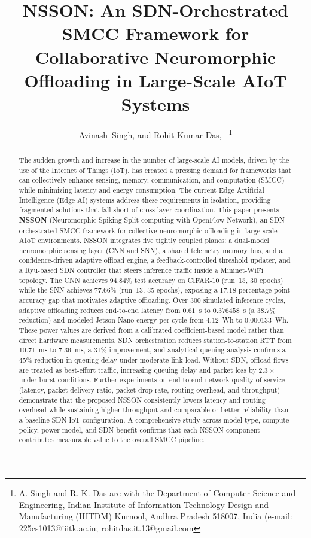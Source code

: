 \documentclass[journal]{IEEEtran}
\title{NSSON: An SDN-Orchestrated SMCC Framework for Collaborative Neuromorphic Offloading in Large-Scale AIoT Systems}
\author{Avinash~Singh, and Rohit Kumar Das,~\IEEEmembership{Senior Member,~IEEE,}
\thanks{A. Singh and R. K. Das are with the Department of Computer Science and Engineering, Indian Institute of Information Technology Design and Manufacturing (IIITDM) Kurnool, Andhra Pradesh 518007, India (e-mail: 225cs1013@iiitk.ac.in; rohitdas.it.13@gmail.com}%
}
\newcommand{\revblue}[1]{\textcolor{revblue}{#1}}
\begin{document}
\maketitle

\begin{abstract}
The sudden growth and increase in the number of large-scale AI models, driven by the use of the Internet of Things (IoT), has created a pressing demand for frameworks that can collectively enhance sensing, memory, communication, and computation (SMCC) while minimizing latency and energy consumption. The current Edge Artificial Intelligence (Edge AI) systems address these requirements in isolation, providing fragmented solutions that fall short of cross-layer coordination. This paper presents \textbf{NSSON} (Neuromorphic Spiking Split-computing with OpenFlow Network), an SDN-orchestrated SMCC framework for collective neuromorphic offloading in large-scale AIoT environments. NSSON integrates five tightly coupled planes: a dual-model neuromorphic sensing layer (CNN and SNN), a shared telemetry memory bus, and a confidence-driven adaptive offload engine, a feedback-controlled threshold updater, and a Ryu-based SDN controller that steers inference traffic inside a
Mininet-WiFi topology. The CNN achieves 94.84\% test accuracy on CIFAR-10
(run~15, 30 epochs) while the SNN achieves 77.66\% (run~13, 35 epochs),
exposing a 17.18 percentage-point accuracy gap that motivates adaptive
offloading. \revblue{Over 300 simulated inference cycles, adaptive offloading reduces
end-to-end latency from $0.61$~s to $0.376458$~s (a $38.7\%$ reduction)
and modeled Jetson Nano energy per cycle from $4.12$~Wh to
$0.000133$~Wh. These power values are derived from a calibrated
coefficient-based model rather than direct hardware measurements.} SDN orchestration reduces
station-to-station RTT from 10.71~ms to 7.36~ms, a 31\% improvement,
and analytical queuing analysis confirms a 45\% reduction in queuing delay
under moderate link load. Without SDN, offload flows are treated as
best-effort traffic, increasing queuing delay and packet loss by $2.3\times$
under burst conditions. 
Further experiments on end-to-end network quality of service (latency, packet delivery ratio, packet drop rate, routing overhead, and throughput) demonstrate that the proposed NSSON consistently lowers latency and routing overhead while sustaining higher throughput and comparable or better reliability than a baseline SDN-IoT configuration. A comprehensive study across model type,
compute policy, power model, and SDN benefit confirms that each NSSON component
contributes measurable value to the overall SMCC pipeline.
\end{abstract}
\end{document}

